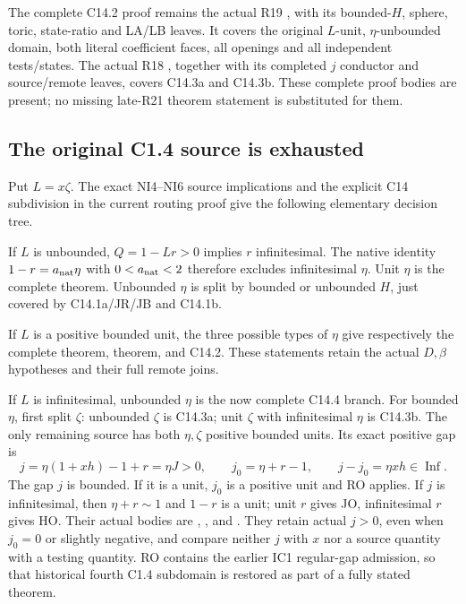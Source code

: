 The complete C14.2 proof remains the actual R19
, with its bounded-$H$,
sphere, toric, state-ratio and LA/LB leaves.  It covers the original
$L$-unit, $\eta$-unbounded domain, both literal coefficient faces,
all openings and all independent tests/states.  The actual R18
, together with its completed
$j$ conductor and source/remote leaves, covers C14.3a and C14.3b.
These complete proof bodies are present; no missing late-R21
theorem statement is substituted for them.

\subsection{The original C1.4 source is exhausted}
Put $L=x\zeta$.  The exact NI4--NI6 source implications and the
explicit C14 subdivision in the current routing proof give the
following elementary decision tree.

If $L$ is unbounded, $Q=1-Lr>0$ implies $r$ infinitesimal.
The native identity $1-r=a_{\rm nat}\eta$ with
$0<a_{\rm nat}<2$ therefore excludes infinitesimal $\eta$.
Unit $\eta$ is the complete
theorem.  Unbounded $\eta$ is split by bounded or unbounded $H$,
just covered by C14.1a/JR/JB and C14.1b.

If $L$ is a positive bounded unit, the three possible types of
$\eta$ give respectively the complete
 theorem,
 theorem,
and C14.2.  These statements retain the actual $D,\beta$ hypotheses
and their full remote joins.

If $L$ is infinitesimal, unbounded $\eta$ is the now complete
C14.4 branch.  For bounded $\eta$, first split $\zeta$:
unbounded $\zeta$ is C14.3a; unit $\zeta$ with infinitesimal
$\eta$ is C14.3b.  The only remaining source has both
$\eta,\zeta$ positive bounded units.  Its exact positive gap is
\[
 j=\eta(1+xh)-1+r=\eta J>0,
 \qquad j_0=\eta+r-1,
 \qquad j-j_0=\eta xh\in\operatorname{Inf}.        \tag{JC6}
\]
The gap $j$ is bounded.  If it is a unit, $j_0$ is a positive
unit and RO applies.  If $j$ is infinitesimal, then
$\eta+r\sim1$ and $1-r$ is a unit; unit $r$ gives JO,
infinitesimal $r$ gives HO.  Their actual bodies are
,
, and
.
They retain actual $j>0$, even when $j_0=0$ or slightly negative,
and compare neither $j$ with $x$ nor a source quantity with a
testing quantity.  RO contains the earlier IC1 regular-gap
admission, so that historical fourth C1.4 subdomain is restored
as part of a fully stated theorem.

